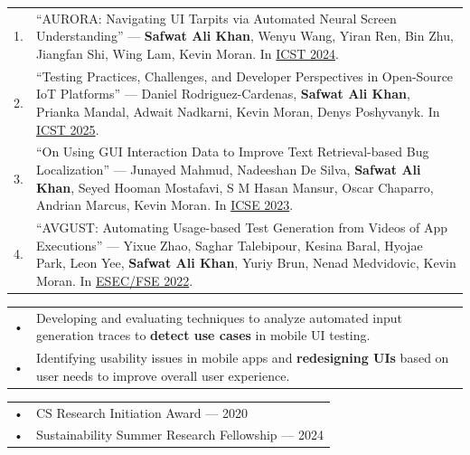 \documentclass[a4paper]{MagicalCV}
\begin{document}
\begin{minipage}[t]{0.66\textwidth} 

\vspace{\topsep} 

\begin{tabular}{@{}p{0.02cm}p{11cm}@{}}
1. & ``AURORA: Navigating UI Tarpits via Automated Neural Screen Understanding'' — \textbf{Safwat Ali Khan}, Wenyu Wang, Yiran Ren, Bin Zhu, Jiangfan Shi, Wing Lam, Kevin Moran. In \href{https://ieeexplore.ieee.org/document/10638617}{ICST 2024}. \\[0.3em]

2. & ``Testing Practices, Challenges, and Developer Perspectives in Open-Source IoT Platforms'' — Daniel Rodriguez-Cardenas, \textbf{Safwat Ali Khan}, Prianka Mandal, Adwait Nadkarni, Kevin Moran, Denys Poshyvanyk. In \href{https://conf.researchr.org/home/icst-2025}{ICST 2025}. \\[0.3em]

3. & ``On Using GUI Interaction Data to Improve Text Retrieval-based Bug Localization'' — Junayed Mahmud, Nadeeshan De Silva, \textbf{Safwat Ali Khan}, Seyed Hooman Mostafavi, S M Hasan Mansur, Oscar Chaparro, Andrian Marcus, Kevin Moran. In \href{https://dl.acm.org/doi/10.1145/3597503.3608139}{ICSE 2023}. \\[0.3em]

4. & ``AVGUST: Automating Usage-based Test Generation from Videos of App Executions'' — Yixue Zhao, Saghar Talebipour, Kesina Baral, Hyojae Park, Leon Yee, \textbf{Safwat Ali Khan}, Yuriy Brun, Nenad Medvidovic, Kevin Moran. In \href{https://dl.acm.org/doi/10.1145/3540250.3549134}{ESEC/FSE 2022}. \\
\end{tabular}



\begin{tabular}{@{}p{0.02cm}p{11cm}@{}}  
• & Developing and evaluating techniques to analyze automated input generation traces to \textbf{detect use cases} in mobile UI testing. \\
• & Identifying usability issues in mobile apps and \textbf{redesigning UIs} based on user needs to improve overall user experience. \\
\end{tabular}

\begin{tabular}{@{}p{0.02cm}p{11cm}@{}}  
• & {CS Research Initiation Award} — 2020 \\
• & {Sustainability Summer Research Fellowship} — 2024 \\
\end{tabular}




\end{minipage}
\end{document}
